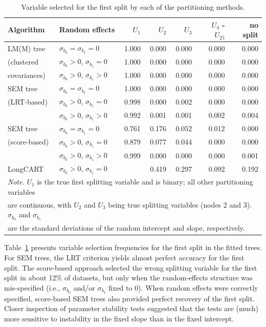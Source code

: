\documentclass[doc,floatsintext,natbib]{apa7}
\begin{document}
\begin{table}[!ht]
\caption{Variable selected for the first split by each of the partitioning methods.} 
\label{tab:first_splits2}
\begin{tabular}{llrrrrr}
  \hline
Algorithm & Random effects & $U_1$ & $U_2$ & $U_3$ & $U_4$ - $U_{25}$ & no split \\ 
  \hline
LM(M) tree & $\sigma_{b_0} = \sigma_{b_1} = 0$ & 1.000 & 0.000 & 0.000 & 0.000 & 0.000 \\ 
    (clustered & $\sigma_{b_0} > 0$, $\sigma_{b_1} = 0$ & 1.000 & 0.000 & 0.000 & 0.000 & 0.000 \\ 
      covariances) & $\sigma_{b_0} > 0$, $\sigma_{b_1} > 0$ & 1.000 & 0.000 & 0.000 & 0.000 & 0.000 \\ 
   \hline
SEM tree & $\sigma_{b_0} = \sigma_{b_1} = 0$ & 1.000 & 0.000 & 0.000 & 0.000 & 0.000 \\ 
    (LRT-based) & $\sigma_{b_0} > 0$, $\sigma_{b_1} = 0$ & 0.998 & 0.000 & 0.002 & 0.000 & 0.000 \\ 
    & $\sigma_{b_0} > 0$, $\sigma_{b_1} > 0$ & 0.992 & 0.001 & 0.001 & 0.002 & 0.004 \\ 
   \hline
SEM tree & $\sigma_{b_0} = \sigma_{b_1} = 0$ & 0.761 & 0.176 & 0.052 & 0.012 & 0.000 \\ 
    (score-based) & $\sigma_{b_0} > 0$, $\sigma_{b_1} = 0$ & 0.879 & 0.077 & 0.044 & 0.000 & 0.000 \\ 
    & $\sigma_{b_0} > 0$, $\sigma_{b_1} > 0$ & 0.999 & 0.000 & 0.000 & 0.000 & 0.001 \\ 
   \hline
LongCART & $\sigma_{b_0} > 0$, $\sigma_{b_1} = 0$ &  & 0.419 & 0.297 & 0.092 & 0.192 \\ 
   \hline \multicolumn{7}{l}{\footnotesize\textit{Note.} $U_1$ is the true first splitting variable and is binary; all other partitioning variables}\\  \multicolumn{7}{l}{\footnotesize are continuous, with $U_2$ and $U_3$ being true splitting variables (nodes 2 and 3). $\sigma_{b_0}$ and $\sigma_{b_1}$}\\  \multicolumn{7}{l}{\footnotesize are the standard deviations of the random intercept and slope, respectively.}\\ \end{tabular}
\end{table}


Table~\ref{tab:first_splits2} presents variable selection frequencies for the first split in the fitted trees. For SEM trees, the LRT criterion yields almost perfect accuracy for the first split. The score-based approach selected the wrong splitting variable for the first split in about 12\% of datasets, but only when the random-effects structure was mis-specified (i.e., $\sigma_{b_0}$ and/or $\sigma_{b_1}$ fixed to 0). When random effects were correctly specified, score-based SEM trees also provided perfect recovery of the first split. Closer inspection of parameter stability tests suggested that the tests are (much) more sensitive to instability in the fixed slope than in the fixed intercept.
\end{document}
